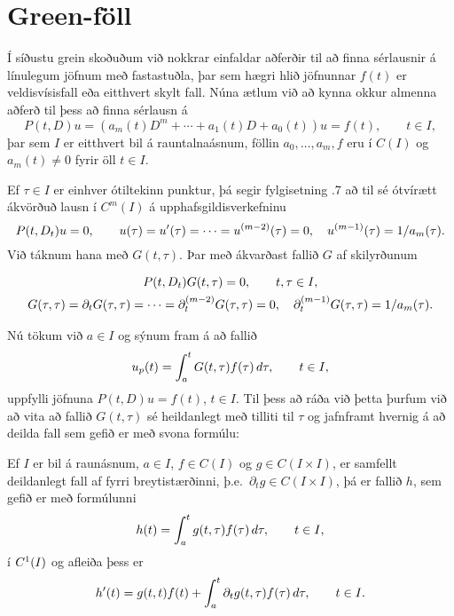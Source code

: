 \section{Green-föll}

\noindent
Í síðustu grein skoðuðum við nokkrar einfaldar aðferðir til að finna
sérlausnir á línulegum jöfnum með fastastuðla, þar sem hægri hlið
jöfnunnar $f(t)$ er veldisvísisfall eða eitthvert skylt fall.  Núna
ætlum við að kynna okkur almenna aðferð til þess að 
finna sérlausn á
 \begin{equation*}P(t,D)u=(a_m(t)D^m+\cdots+a_1(t)D+a_0(t))u=f(t), \qquad
t\in I,
\label{2.5.1}
 \end{equation*}
þar sem $I$ er eitthvert bil á rauntalnaásnum, föllin $a_0,
\dots,a_m,f$ eru í $C(I)$ og $a_m(t)\neq 0$ fyrir öll $t\in I$.  

Ef $\tau\in I$ er einhver ótiltekinn punktur, þá segir fylgisetning .7 að til sé ótvírætt ákvörðuð lausn í $C^m(I)$ á
upphafs\-gildis\-verk\-efninu 
 $$P(t,D_t)u=0, \qquad
u(\tau)=u{\sp{\prime}}(\tau)=\cdots=u\sp{(m-2)}(\tau)=0, \quad 
u\sp{(m-1)}(\tau)=1/a_m({\tau}). 
 $$
Við táknum hana með $G(t,\tau)$.  Þar með ákvarðast fallið $G$ af
skilyrðunum 
 
\begin{gather*}
P(t,D_t)G(t,\tau)=0,  \qquad t,\tau\in I,\label{2.5.2}\\
G(\tau,\tau)=\partial_tG(\tau,\tau)=\cdots=
\partial_t\sp{(m-2)}G(\tau,\tau)=0, \quad
\partial_t\sp{(m-1)}G(\tau,\tau)=1/a_m({\tau})\label{2.5.3}. 
\end{gather*}
 
Nú tökum við $a\in I$ og sýnum fram á
að fallið 
\begin{equation*}
u_p(t) = \int_a\sp t G(t,\tau)f(\tau) \, d\tau, \qquad t\in I,\label{2.5.4}
\end{equation*}
uppfylli jöfnuna $P(t,D)u=f(t)$, $t\in I$.
Til þess að ráða við þetta þurfum við að vita að fallið $G(t,\tau)$
sé heildanlegt með tilliti til $\tau$ og jafnframt hvernig á að deilda
fall sem gefið er með svona formúlu:

\begin{hs}\label{hs2.5.1}
Ef $I$ er bil á raunásnum, $a\in I$, $f\in C(I)$ og $g\in
C(I\times I)$, er samfellt deildanlegt fall af fyrri breytistærðinni,
þ.e.~${\partial}_tg\in C(I\times I)$,  þá
er fallið $h$, sem gefið er með formúlunni  
 $$h(t)=\int_a\sp t g(t, \tau)f(\tau) \, d\tau, \qquad t\in I,
 $$
í $C\sp 1(I)$ og afleiða þess er 
 $$h{\sp{\prime}}(t)=g(t,t)f(t)+\int_a\sp t \partial_tg(t,\tau)f(\tau) \, d\tau,
\qquad t\in I.
 $$
\end{hs}

